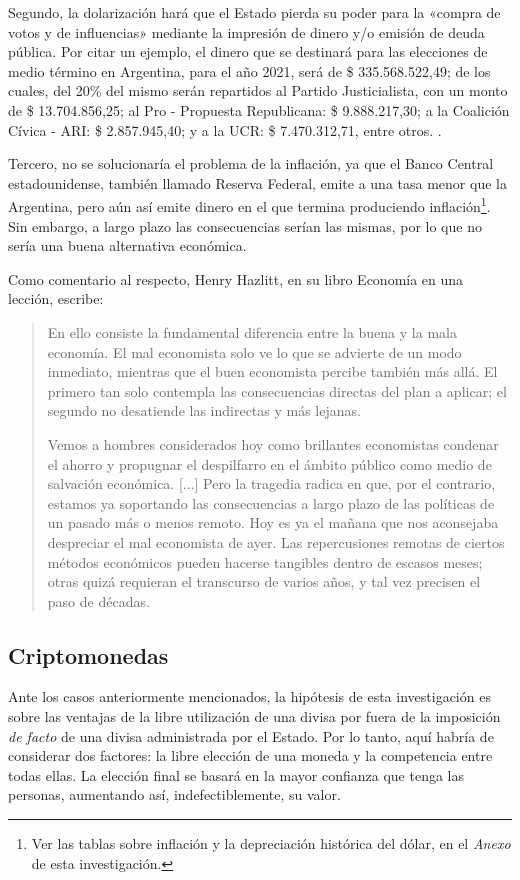 \documentclass[12pt,a4paper,twoside]{book}
\begin{document}
Segundo, la dolarización hará que el Estado pierda su poder para la «compra de votos y de influencias» mediante la impresión de dinero y/o emisión de deuda pública. Por citar un ejemplo, el dinero que se destinará para las elecciones de medio término en Argentina, para el año 2021, será de \$ 335.568.522,49; de los cuales, del 20\% del mismo serán repartidos al Partido Justicialista, con un monto de \$ 13.704.856,25; al Pro - Propuesta Republicana: \$ 9.888.217,30; a la Coalición Cívica - ARI: \$ 2.857.945,40; y a la UCR: \$ 7.470.312,71, entre otros. \cite{bae:dinpaso}.

Tercero, no se solucionaría el problema de la inflación, ya que el Banco Central estadounidense, también llamado Reserva Federal, emite a una tasa menor que la Argentina, pero aún así emite dinero en el que termina produciendo inflación\footnote{Ver las tablas sobre inflación y la depreciación histórica del dólar, en el \textit{Anexo} de esta investigación.}. Sin embargo, a largo plazo las consecuencias serían las mismas, por lo que no sería una buena alternativa económica.

Como comentario al respecto, Henry Hazlitt, en su libro Economía en una lección, escribe:

\begin{quotation}
En ello consiste la fundamental diferencia entre la buena y la mala economía. El mal economista solo ve lo que se advierte de un modo inmediato, mientras que el buen economista percibe también más allá. El primero tan solo contempla las consecuencias directas del plan a aplicar; el segundo no desatiende las indirectas y más lejanas.

Vemos a hombres considerados hoy como brillantes economistas condenar el ahorro y propugnar el despilfarro en el ámbito público como medio de salvación económica. [...] Pero la tragedia radica en que, por el contrario, estamos ya soportando las consecuencias a largo plazo de las políticas de un pasado más o menos remoto. Hoy es ya el mañana que nos aconsejaba despreciar el mal economista de ayer. Las repercusiones remotas de ciertos métodos económicos pueden hacerse tangibles dentro de escasos meses; otras quizá requieran el transcurso de varios años, y tal vez precisen el paso de décadas. \cite[pág. 12]{hazlitt:econo1lec}
\end{quotation}

\subsection{Criptomonedas}
Ante los casos anteriormente mencionados, la hipótesis de esta investigación es sobre las ventajas de la libre utilización de una divisa por fuera de la imposición \textit{de facto} de una divisa administrada por el Estado. Por lo tanto, aquí habría de considerar dos factores: la libre elección de una moneda y la competencia entre todas ellas. La elección final se basará en la mayor confianza que tenga las personas, aumentando así, indefectiblemente, su valor.
\end{document}

